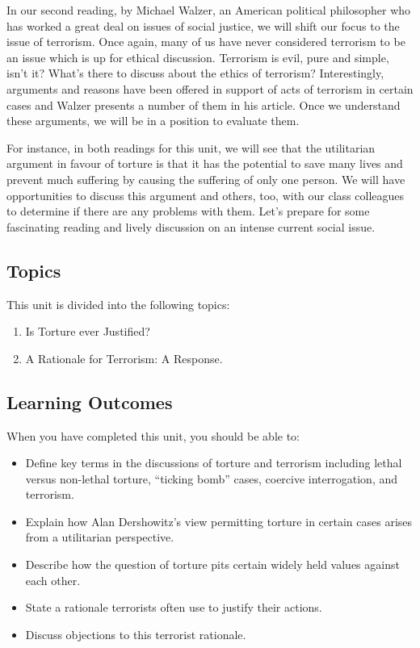 \documentclass[
]{book}
\providecommand{\tightlist}{%
  \setlength{\itemsep}{0pt}\setlength{\parskip}{0pt}}
\begin{document}
In our second reading, by Michael Walzer, an American political philosopher who has worked a great deal on issues of social justice, we will shift our focus to the issue of terrorism. Once again, many of us have never considered terrorism to be an issue which is up for ethical discussion. Terrorism is evil, pure and simple, isn't it? What's there to discuss about the ethics of terrorism? Interestingly, arguments and reasons have been offered in support of acts of terrorism in certain cases and Walzer presents a number of them in his article. Once we understand these arguments, we will be in a position to evaluate them.

For instance, in both readings for this unit, we will see that the utilitarian argument in favour of torture is that it has the potential to save many lives and prevent much suffering by causing the suffering of only one person. We will have opportunities to discuss this argument and others, too, with our class colleagues to determine if there are any problems with them. Let's prepare for some fascinating reading and lively discussion on an intense current social issue.

\hypertarget{topics-5}{%
\subsection*{Topics}\label{topics-5}}

This unit is divided into the following topics:

\begin{enumerate}
\def\labelenumi{\arabic{enumi}.}
\tightlist
\item
  Is Torture ever Justified?\\
\item
  A Rationale for Terrorism: A Response.
\end{enumerate}

\hypertarget{learning-outcomes-5}{%
\subsection*{Learning Outcomes}\label{learning-outcomes-5}}

When you have completed this unit, you should be able to:

\begin{itemize}
\tightlist
\item
  Define key terms in the discussions of torture and terrorism including lethal versus non-lethal torture, ``ticking bomb'' cases, coercive interrogation, and terrorism.
\item
  Explain how Alan Dershowitz's view permitting torture in certain cases arises from a utilitarian perspective.
\item
  Describe how the question of torture pits certain widely held values against each other.
\item
  State a rationale terrorists often use to justify their actions.
\item
  Discuss objections to this terrorist rationale.
\end{itemize}
\end{document}
